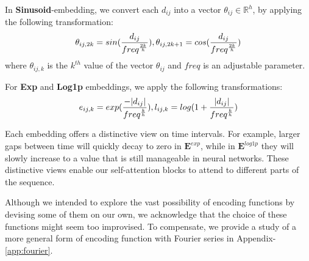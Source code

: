 In \textbf{Sinusoid}-embedding, we convert each $d_{ij}$ into a vector $\theta_{ij} \in \mathbb{R}^{h}$, by applying the following transformation:
\begin{displaymath}
  \theta_{ij, 2k} = sin(\frac{d_{ij}}{freq^{\frac{2k}{h}}})\\
  , \theta_{ij, 2k+1} = cos(\frac{d_{ij}}{freq^{\frac{2k}{h}}})
\end{displaymath}
where $\theta_{ij, k}$ is the $k^{th}$ value of the vector $\theta_{ij}$ and $freq$ is an adjustable parameter.

For \textbf{Exp} and \textbf{Log1p} embeddings, we apply the following transformations:
\begin{displaymath}
  e_{ij, k} = exp(\frac{-|d_{ij}|}{freq^{\frac{k}{h}}})\\
  , l_{ij, k} = log(1 + \frac{|d_{ij}|}{freq^{\frac{k}{h}}})
\end{displaymath}

Each embedding offers a distinctive view on time intervals. For example, larger gaps between time will quickly decay to zero in $\mathbf{E}^{exp}$, while in $\mathbf{E}^{log1p}$ they will slowly increase to a value that is still manageable in neural networks. These distinctive views enable our self-attention blocks to attend to different parts of the sequence.


Although we intended to explore the vast possibility of encoding functions by devising some of them on our own, we acknowledge that the choice of these functions might seem too improvised. To compensate, we provide a study of a more general form of encoding function with Fourier series in Appendix-\ref{app:fourier}.